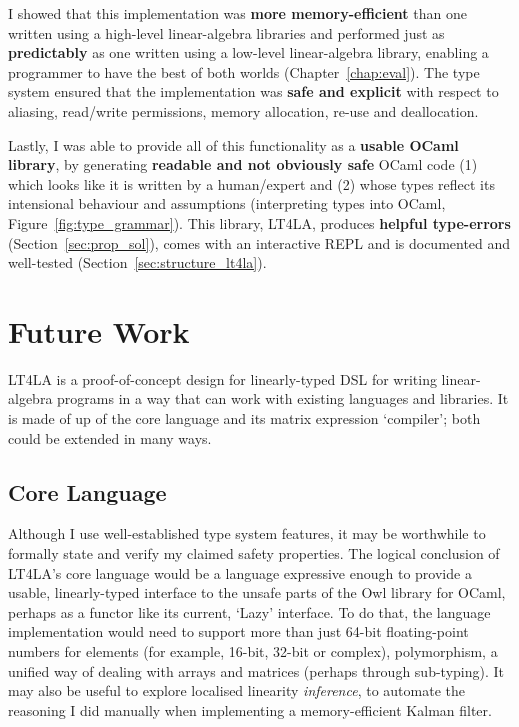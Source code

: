 I showed that this implementation was \textbf{more memory-efficient} than one
written using a high-level linear-algebra libraries and performed just as
\textbf{predictably} as one written using a low-level linear-algebra library,
enabling a programmer to have the best of both worlds
(Chapter~\ref{chap:eval}). The type system ensured that the implementation was
\textbf{safe and explicit} with respect to aliasing, read/write permissions,
memory allocation, re-use and deallocation.

Lastly, I was able to provide all of this functionality as a \textbf{usable
OCaml library}, by generating \textbf{readable and not obviously safe} OCaml
code (1) which looks like it is written by a human/expert and (2) whose types
reflect its intensional behaviour and assumptions (interpreting types into
OCaml, Figure~\ref{fig:type_grammar}). This library, LT4LA, produces
\textbf{helpful type-errors} (Section~\ref{sec:prop_sol}), comes with an
interactive REPL and is documented and well-tested
(Section~\ref{sec:structure_lt4la}).

\section{Future Work}

LT4LA is a proof-of-concept design for linearly-typed DSL for writing
linear-algebra programs in a way that can work with existing languages and
libraries. It is made of up of the core language and its matrix expression
`compiler'; both could be extended in many ways.

\subsection{Core Language}

Although I use well-established type system features, it may be worthwhile to
formally state and verify my claimed safety properties.  The logical conclusion
of LT4LA's core language would be a language expressive enough to provide a
usable, linearly-typed interface to the unsafe parts of the Owl library for
OCaml, perhaps as a functor like its current, `Lazy' interface.  To do that,
the language implementation would need to support more than just 64-bit
floating-point numbers for elements (for example, 16-bit, 32-bit or complex),
polymorphism, a unified way of dealing with arrays and matrices (perhaps
through sub-typing). It may also be useful to explore localised linearity
\emph{inference}, to automate the reasoning I did manually when implementing a
memory-efficient Kalman filter.

